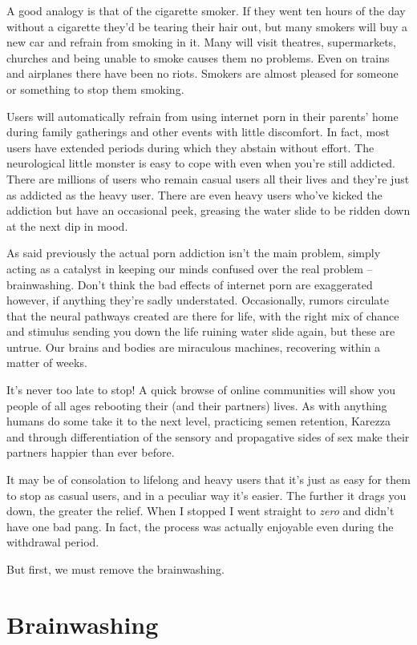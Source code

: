 \documentclass[
]{book}
\begin{document}
A good analogy is that of the cigarette smoker. If they went ten hours of the day without a cigarette they'd be tearing their hair out, but many smokers will buy a new car and refrain from smoking in it. Many will visit theatres, supermarkets, churches and being unable to smoke causes them no problems. Even on trains and airplanes there have been no riots. Smokers are almost pleased for someone or something to stop them smoking.

Users will automatically refrain from using internet porn in their parents' home during family gatherings and other events with little discomfort. In fact, most users have extended periods during which they abstain without effort. The neurological little monster is easy to cope with even when you're still addicted. There are millions of users who remain casual users all their lives and they're just as addicted as the heavy user. There are even heavy users who've kicked the addiction but have an occasional peek, greasing the water slide to be ridden down at the next dip in mood.

As said previously the actual porn addiction isn't the main problem, simply acting as a catalyst in keeping our minds confused over the real problem -- brainwashing. Don't think the bad effects of internet porn are exaggerated however, if anything they're sadly understated. Occasionally, rumors circulate that the neural pathways created are there for life, with the right mix of chance and stimulus sending you down the life ruining water slide again, but these are untrue. Our brains and bodies are miraculous machines, recovering within a matter of weeks.

It's never too late to stop! A quick browse of online communities will show you people of all ages rebooting their (and their partners) lives. As with anything humans do some take it to the next level, practicing semen retention, Karezza and through differentiation of the sensory and propagative sides of sex make their partners happier than ever before.

It may be of consolation to lifelong and heavy users that it's just as easy for them to stop as casual users, and in a peculiar way it's easier. The further it drags you down, the greater the relief. When I stopped I went straight to \emph{zero} and didn't have one bad pang. In fact, the process was actually enjoyable even during the withdrawal period.

But first, we must remove the brainwashing.

\hypertarget{brainwashing}{%
\chapter{Brainwashing}\label{brainwashing}}
\end{document}
